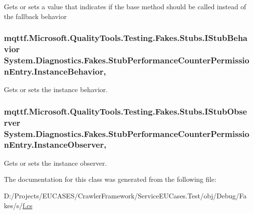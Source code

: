 Gets or sets a value that indicates if the base method should be called instead of the fallback behavior

\hypertarget{class_system_1_1_diagnostics_1_1_fakes_1_1_stub_performance_counter_permission_entry_a53fdfe610a75174d6bc2fa4f8a4108ba}{
\subsubsection[{Instance\-Behavior}]{\setlength{\rightskip}{0pt plus 5cm}mqttf.\-Microsoft.\-Quality\-Tools.\-Testing.\-Fakes.\-Stubs.\-I\-Stub\-Behavior System.\-Diagnostics.\-Fakes.\-Stub\-Performance\-Counter\-Permission\-Entry.\-Instance\-Behavior\hspace{0.3cm}{\ttfamily [get]}, {\ttfamily [set]}}}\label{class_system_1_1_diagnostics_1_1_fakes_1_1_stub_performance_counter_permission_entry_a53fdfe610a75174d6bc2fa4f8a4108ba}


Gets or sets the instance behavior.

\hypertarget{class_system_1_1_diagnostics_1_1_fakes_1_1_stub_performance_counter_permission_entry_ac4f26f55f098fdf7df7276339bec7501}{
\subsubsection[{Instance\-Observer}]{\setlength{\rightskip}{0pt plus 5cm}mqttf.\-Microsoft.\-Quality\-Tools.\-Testing.\-Fakes.\-Stubs.\-I\-Stub\-Observer System.\-Diagnostics.\-Fakes.\-Stub\-Performance\-Counter\-Permission\-Entry.\-Instance\-Observer\hspace{0.3cm}{\ttfamily [get]}, {\ttfamily [set]}}}\label{class_system_1_1_diagnostics_1_1_fakes_1_1_stub_performance_counter_permission_entry_ac4f26f55f098fdf7df7276339bec7501}


Gets or sets the instance observer.



The documentation for this class was generated from the following file\-:\begin{DoxyCompactItemize}
\item 
D\-:/\-Projects/\-E\-U\-C\-A\-S\-E\-S/\-Crawler\-Framework/\-Service\-E\-U\-Cases.\-Test/obj/\-Debug/\-Fakes/s/\hyperlink{s_2f_8cs}{f.\-cs}\end{DoxyCompactItemize}
